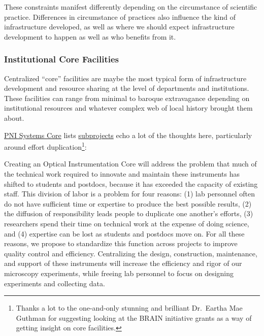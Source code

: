\documentclass[11pt]{article}
\begin{document}
\begin{multicols}{2}
 These constraints manifest differently depending on the
circumstance of scientific practice. Differences in circumstance of
practices also influence the kind of infrastructure developed, as well
as where we should expect infrastructure development to happen as well
as who benefits from it.

\hypertarget{institutional-core-facilities}{%
\subsubsection{Institutional Core
Facilities}\label{institutional-core-facilities}}

Centralized ``core'' facilities are maybe the most typical form of
infrastructure development and resource sharing at the level of
departments and institutions. These facilities can range from minimal to
baroque extravagance depending on institutional resources and whatever
complex web of local history brought them about.

\href{https://projectreporter.nih.gov/project_info_details.cfm?aid=9444124}{PNI
Systems Core} lists
\href{https://projectreporter.nih.gov/project_info_subprojects.cfm?aid=9444124\&icde=0}{subprojects}
echo a lot of the thoughts here, particularly around effort
duplication\footnote{Thanks a lot to the one-and-only stunning and
  brilliant Dr.~Eartha Mae Guthman for suggesting looking at the BRAIN
  initiative grants as a way of getting insight on core facilities.}:

\begin{leftbar}
Creating an Optical Instrumentation Core will address the problem that
much of the technical work required to innovate and maintain these
instruments has shifted to students and postdocs, because it has
exceeded the capacity of existing staff. This division of labor is a
problem for four reasons: (1) lab personnel often do not have sufficient
time or expertise to produce the best possible results, (2) the
diffusion of responsibility leads people to duplicate one another's
efforts, (3) researchers spend their time on technical work at the
expense of doing science, and (4) expertise can be lost as students and
postdocs move on. For all these reasons, we propose to standardize this
function across projects to improve quality control and efficiency.
Centralizing the design, construction, maintenance, and support of these
instruments will increase the efficiency and rigor of our microscopy
experiments, while freeing lab personnel to focus on designing
experiments and collecting data.
\end{leftbar}


\end{multicols}
\end{document}
